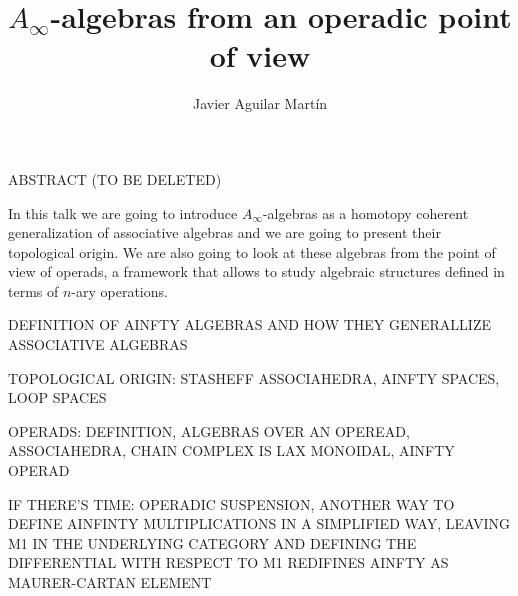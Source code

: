 \documentclass{beamer}
\title{$A_\infty$-algebras from an operadic point of view}
\author{Javier Aguilar Mart\'in}
\institute{University of Kent}
\date{}
\theoremstyle{definition}
\begin{document}
\frame{\titlepage}
%
% 
% 
% 

% 



\newcommand{\seti}{\setcounter{saveenumi}{\value{enumi}}}
\newcommand{\conti}{\setcounter{enumi}{\value{saveenumi}}}

\makeatletter
\newcommand{\xRightarrow}[2][]{\ext@arrow 0359\Rightarrowfill@{#1}{#2}}
\makeatother


\begin{frame}
ABSTRACT (TO BE DELETED)

In this talk we are going to introduce $A_\infty$-algebras as a homotopy coherent generalization of associative algebras and we are going to present their topological origin. We are also going to look at these algebras from the point of view of operads, a framework that allows to study algebraic structures defined in terms of $n$-ary operations.
\end{frame}




\begin{frame}
DEFINITION OF AINFTY ALGEBRAS AND HOW THEY GENERALLIZE ASSOCIATIVE ALGEBRAS

TOPOLOGICAL ORIGIN: STASHEFF ASSOCIAHEDRA, AINFTY SPACES, LOOP SPACES

OPERADS: DEFINITION, ALGEBRAS OVER AN OPEREAD, ASSOCIAHEDRA, CHAIN COMPLEX IS LAX MONOIDAL, AINFTY OPERAD

IF THERE'S TIME: OPERADIC SUSPENSION, ANOTHER WAY TO DEFINE AINFINTY MULTIPLICATIONS IN A SIMPLIFIED WAY, LEAVING M1 IN THE UNDERLYING CATEGORY AND DEFINING THE DIFFERENTIAL WITH RESPECT TO M1 REDIFINES AINFTY AS MAURER-CARTAN ELEMENT
\end{frame}
\end{document}
